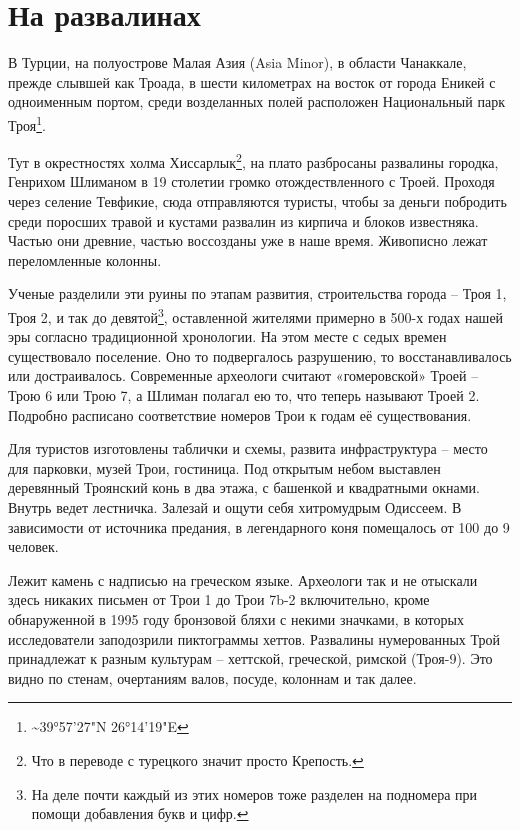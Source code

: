 \chapter{На развалинах}

В Турции, на полуострове Малая Азия (Asia Minor), в области Чанаккале, прежде слывшей как Троада, в шести километрах на восток от города Еникей с одноименным портом, среди возделанных полей расположен Национальный парк Троя\footnote{\textasciitilde{}39°57'27"N 26°14'19"E}.

Тут в окрестностях холма Хиссарлык\footnote{Что в переводе с турецкого значит просто Крепость.}, на плато разбросаны развалины городка, Генрихом Шлиманом в 19 столетии громко отождествленного с Троей. Проходя через селение Тевфикие, сюда отправляются туристы, чтобы за деньги побродить среди поросших травой и кустами развалин из кирпича и блоков известняка. Частью они древние, частью воссозданы уже в наше время. Живописно лежат переломленные колонны.

Ученые разделили эти руины по этапам развития, строительства города – Троя 1, Троя 2, и так до девятой\footnote{На деле почти каждый из этих номеров тоже разделен на подномера при помощи добавления букв и цифр.}, оставленной жителями примерно в 500-х годах нашей эры согласно традиционной хронологии. На этом месте с седых времен существовало поселение. Оно то подвергалось разрушению, то восстанавливалось или достраивалось. Современные археологи считают «гомеровской» Троей – Трою 6 или Трою 7, а Шлиман полагал ею то, что теперь называют Троей 2. Подробно расписано соответствие номеров Трои к годам её существования.

Для туристов изготовлены таблички и схемы, развита инфраструктура – место для парковки, музей Трои, гостиница. Под открытым небом выставлен деревянный Троянский конь в два этажа, с башенкой и квадратными окнами. Внутрь ведет лестничка. Залезай и ощути себя хитромудрым Одиссеем. В зависимости от источника предания, в легендарного коня помещалось от 100 до 9 человек.

Лежит камень с надписью на греческом языке. Археологи так и не отыскали здесь никаких письмен от Трои 1 до Трои 7b-2 включительно, кроме обнаруженной в 1995 году бронзовой бляхи с некими значками, в которых исследователи заподозрили пиктограммы хеттов. Развалины нумерованных Трой принадлежат к разным культурам – хеттской, греческой, римской (Троя-9). Это видно по стенам, очертаниям валов, посуде, колоннам и так далее.

